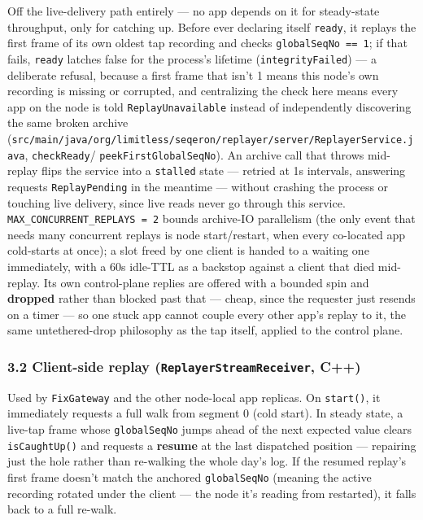 \documentclass[
  10pt,
]{article}
\begin{document}
Off the live-delivery path entirely --- no app depends on it for
steady-state throughput, only for catching up. Before ever declaring
itself \texttt{ready}, it replays the first frame of its own oldest tap
recording and checks \texttt{globalSeqNo\ ==\ 1}; if that fails,
\texttt{ready} latches false for the process's lifetime
(\texttt{integrityFailed}) --- a deliberate refusal, because a first
frame that isn't 1 means this node's own recording is missing or
corrupted, and centralizing the check here means every app on the node
is told \texttt{ReplayUnavailable} instead of independently discovering
the same broken archive
(\texttt{src/main/java/org/limitless/seqeron/replayer/server/ReplayerService.java},
\texttt{checkReady}/ \texttt{peekFirstGlobalSeqNo}). An archive call
that throws mid-replay flips the service into a \texttt{stalled} state
--- retried at 1s intervals, answering requests \texttt{ReplayPending}
in the meantime --- without crashing the process or touching live
delivery, since live reads never go through this service.
\texttt{MAX\_CONCURRENT\_REPLAYS\ =\ 2} bounds archive-IO parallelism
(the only event that needs many concurrent replays is node
start/restart, when every co-located app cold-starts at once); a slot
freed by one client is handed to a waiting one immediately, with a 60s
idle-TTL as a backstop against a client that died mid-replay. Its own
control-plane replies are offered with a bounded spin and
\textbf{dropped} rather than blocked past that --- cheap, since the
requester just resends on a timer --- so one stuck app cannot couple
every other app's replay to it, the same untethered-drop philosophy as
the tap itself, applied to the control plane.

\subsubsection{\texorpdfstring{3.2 Client-side replay
(\texttt{ReplayerStreamReceiver},
C++)}{3.2 Client-side replay (ReplayerStreamReceiver, C++)}}\label{client-side-replay-replayerstreamreceiver-c}

Used by \texttt{FixGateway} and the other node-local app replicas. On
\texttt{start()}, it immediately requests a full walk from segment 0
(cold start). In steady state, a live-tap frame whose
\texttt{globalSeqNo} jumps ahead of the next expected value clears
\texttt{isCaughtUp()} and requests a \textbf{resume} at the last
dispatched position --- repairing just the hole rather than re-walking
the whole day's log. If the resumed replay's first frame doesn't match
the anchored \texttt{globalSeqNo} (meaning the active recording rotated
under the client --- the node it's reading from restarted), it falls
back to a full re-walk.
\end{document}
